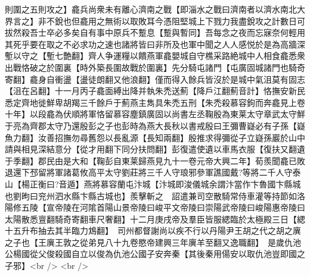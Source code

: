 則圍之五則攻之】龕兵尚衆未有離心濟南之戰【即淄水之戰曰濟南者以濟水南北大界言之】非不銳也但龕用之無術以取敗耳今憑阻堅城上下戮力我盡銳攻之計數日可拔然殺吾士卒必多矣自有事中原兵不蹔息【蹔與暫同】吾每念之夜而忘寐奈何輕用其死乎要在取之不必求功之速也諸將皆曰非所及也軍中聞之人人感悦於是為高牆深塹以守之【塹七艶翻】齊人争運糧以饋燕軍龕嬰城自守樵采路絶城中人相食龕悉衆出戰恪破之於圍裏【時外築長圍故戰於圍裏】先分騎屯諸門【屯廣固城諸門也騎奇寄翻】龕身自衝盪【盪徒朗翻又他浪翻】僅而得入餘兵皆沒於是城中氣沮莫有固志【沮在呂翻】十一月丙子龕面縛出降并執朱禿送薊【降戶江翻薊音計】恪撫安新民悉定齊地徙鮮卑胡羯三千餘戶于薊燕主雋具朱禿五刑【朱禿殺慕容鉤而奔龕見上卷十年】以段龕為伏順將軍恪留慕容塵鎮廣固以尚書左丞鞠殷為東莱太守章武太守鮮于亮為齊郡太守乃還殷彭之子也彭時為燕大長秋以書戒殷曰王彌曹嶷必有子孫【嶷魚力翻】汝善招撫勿尋舊怨以長亂源【長知兩翻】殷推求得彌從子立嶷孫巖於山中請與相見深結意分【從才用翻下同分扶問翻】彭復遣使遺以車馬衣服【復扶又翻遺于季翻】郡民由是大和【鞠彭自東莱歸燕見九十一卷元帝大興二年】荀羨聞龕已敗退還下邳留將軍諸葛攸高平太守劉莊將三千人守琅邪參軍譙國戴?等將二千人守泰山【楊正衡曰?音遁】燕將慕容蘭屯汴城【汴城即浚儀城余謂汴當作卞魯國卞縣城也劉昫曰兖州泗水縣卞縣古城也】羨擊斬之　詔遣兼司空散騎常侍車灌等持節如洛陽修五陵【宣帝陵在河隂首陽山景帝陵曰峻平文帝陵曰崇陽武帝陵曰峻陽惠帝陵曰太陽散悉亶翻騎奇寄翻車尺奢翻】十二月庚戌帝及羣臣皆服緦臨於太極殿三日【緦十五升布抽去其半臨力鴆翻】　司州都督謝尚以疾不行以丹陽尹王胡之代之胡之廙之子也【王廙王敦之從弟見八十九卷愍帝建興三年廙羊至翻又逸職翻】　是歲仇池公楊國從父俊殺國自立以俊為仇池公國子安奔秦【其後秦用偒安以取仇池豈即國之子邪】<br />
<br />
